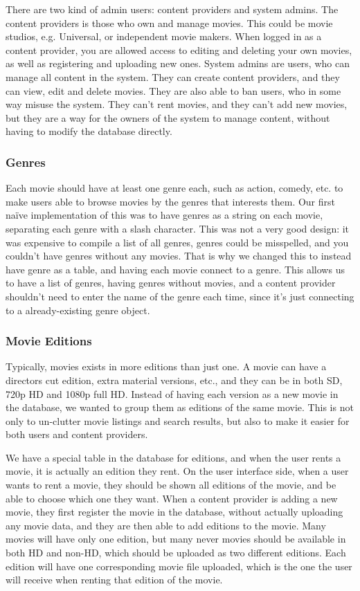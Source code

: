 There are two kind of admin users: content providers and system admins. The content providers is those who own and manage movies. This could be movie studios, e.g. Universal, or independent movie makers. When logged in as a content provider, you are allowed access to editing and deleting your own movies, as well as registering and uploading new ones. System admins are users, who can manage all content in the system. They can create content providers, and they can view, edit and delete movies. They are also able to ban users, who in some way misuse the system. They can't rent movies, and they can't add new movies, but they are a way for the owners of the system to manage content, without having to modify the database directly.

\subsubsection{Genres}
\label{Design_Service_Analysis_Genres}
Each movie should have at least one genre each, such as action, comedy, etc. to make users able to browse movies by the genres that interests them. Our first naïve implementation of this was to have genres as a string on each movie, separating each genre with a slash character. This was not a very good design: it was expensive to compile a list of all genres, genres could be misspelled, and you couldn't have genres without any movies. That is why we changed this to instead have genre as a table, and having each movie connect to a genre. This allows us to have a list of genres, having genres without movies, and a content provider shouldn't need to enter the name of the genre each time, since it's just connecting to a already-existing genre object.

\subsubsection{Movie Editions}
\label{Design_Service_Analysis_MovieEditions}
Typically, movies exists in more editions than just one. A movie can have a directors cut edition, extra material versions, etc., and they can be in both SD, 720p HD and 1080p full HD. Instead of having each version as a new movie in the database, we wanted to group them as editions of the same movie. This is not only to un-clutter movie listings and search results, but also to make it easier for both users and content providers.

We have a special table in the database for editions, and when the user rents a movie, it is actually an edition they rent. On the user interface side, when a user wants to rent a movie, they should be shown all editions of the movie, and be able to choose which one they want. When a content provider is adding a new movie, they first register the movie in the database, without actually uploading any movie data, and they are then able to add editions to the movie. Many movies will have only one edition, but many never movies should be available in both HD and non-HD, which should be uploaded as two different editions. Each edition will have one corresponding movie file uploaded, which is the one the user will receive when renting that edition of the movie.

